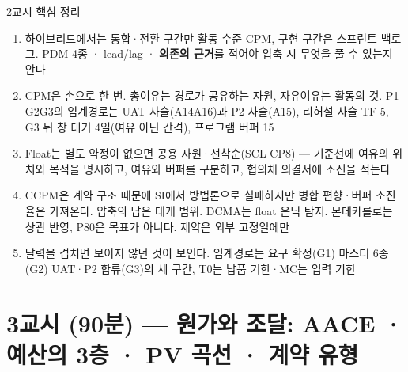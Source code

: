 \begin{frame}{2교시 핵심 정리}
\begin{enumerate}
\item 하이브리드에서는 통합·전환 구간만 활동 수준 CPM, 구현 구간은 스프린트 백로그. PDM 4종 · lead/lag · \textbf{의존의 근거}를 적어야 압축 시 무엇을 풀 수 있는지 안다
\item CPM은 손으로 한 번. 총여유는 경로가 공유하는 자원, 자유여유는 활동의 것. P1 G2\ra{}G3의 임계경로는 UAT 사슬(A14\ra{}A16)과 P2 사슬(A15), 리허설 사슬 TF 5, G3 뒤 창 대기 4일(여유 아닌 간격), 프로그램 버퍼 15
\item Float는 별도 약정이 없으면 공용 자원·선착순(SCL CP8) — 기준선에 여유의 위치와 목적을 명시하고, 여유와 버퍼를 구분하고, 협의체 의결서에 소진을 적는다
\item CCPM은 계약 구조 때문에 SI에서 방법론으로 실패하지만 병합 편향·버퍼 소진율은 가져온다. 압축의 답은 대개 범위. DCMA는 float 은닉 탐지. 몬테카를로는 상관 반영, P80은 목표가 아니다. 제약은 외부 고정일에만
\item 달력을 겹치면 보이지 않던 것이 보인다. 임계경로는 요구 확정(G1) \ra{} 마스터 6종(G2) \ra{} UAT·P2 합류(G3)의 세 구간, T0는 납품 기한·MC는 입력 기한
\end{enumerate}
\end{frame}

\section{3교시 (90분) — 원가와 조달: AACE · 예산의 3층 · PV 곡선 · 계약 유형}

